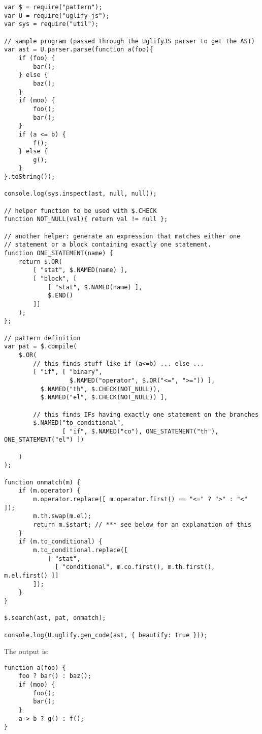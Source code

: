 \documentclass[a4paper,10pt]{article}
\begin{document}
\begin{verbatim}
var $ = require("pattern");
var U = require("uglify-js");
var sys = require("util");

// sample program (passed through the UglifyJS parser to get the AST)
var ast = U.parser.parse(function a(foo){
    if (foo) {
        bar();
    } else {
        baz();
    }
    if (moo) {
        foo();
        bar();
    }
    if (a <= b) {
        f();
    } else {
        g();
    }
}.toString());

console.log(sys.inspect(ast, null, null));

// helper function to be used with $.CHECK
function NOT_NULL(val){ return val != null };

// another helper: generate an expression that matches either one
// statement or a block containing exactly one statement.
function ONE_STATEMENT(name) {
    return $.OR(
        [ "stat", $.NAMED(name) ],
        [ "block", [
            [ "stat", $.NAMED(name) ],
            $.END()
        ]]
    );
};

// pattern definition
var pat = $.compile(
    $.OR(
        // this finds stuff like if (a<=b) ... else ...
        [ "if", [ "binary",
                  $.NAMED("operator", $.OR("<=", ">=")) ],
          $.NAMED("th", $.CHECK(NOT_NULL)),
          $.NAMED("el", $.CHECK(NOT_NULL)) ],

        // this finds IFs having exactly one statement on the branches
        $.NAMED("to_conditional",
                [ "if", $.NAMED("co"), ONE_STATEMENT("th"), ONE_STATEMENT("el") ])

    )
);

function onmatch(m) {
    if (m.operator) {
        m.operator.replace([ m.operator.first() == "<=" ? ">" : "<" ]);
        m.th.swap(m.el);
        return m.$start; // *** see below for an explanation of this
    }
    if (m.to_conditional) {
        m.to_conditional.replace([
            [ "stat",
              [ "conditional", m.co.first(), m.th.first(), m.el.first() ]]
        ]);
    }
}

$.search(ast, pat, onmatch);

console.log(U.uglify.gen_code(ast, { beautify: true }));
\end{verbatim}

The output is:


\begin{verbatim}
function a(foo) {
    foo ? bar() : baz();
    if (moo) {
        foo();
        bar();
    }
    a > b ? g() : f();
}
\end{verbatim}
\end{document}
